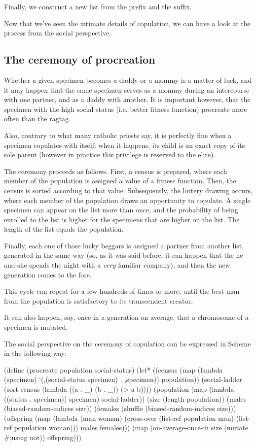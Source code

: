 Finally, we construct a new list from the prefix and the
suffix.

Now that we've seen the intimate details of copulation,
we can have a look at the process from the social perspective.

\subsection{The ceremony of procreation}

Whether a given specimen becomes a daddy or a mommy is
a matter of luck, and it may happen that the same specimen
serves as a mommy during an intercourse with one partner,
and as a daddy with another. It is important however, that the
specimen with the high social status (i.e. better fitness
function) procreate more often than the ragtag.

Also, contrary to what many catholic priests say, it is
perfectly fine when a specimen copulates with itself:
when it happens, its child is an exact copy of its sole
parent (however in practice this privilege is reserved
to the elite).

The ceremony proceeds as follows. First, a census is prepared,
where each member of the population is assigned a value
of a fitness function. Then, the census is sorted according
to that value. Subsequently, the lottery drawing occurs, where each
member of the population draws an opportunity to copulate.
A single specimen can appear on the list more than once, and
the probability of being enrolled to the list is higher for
the specimens that are higher on the list. The length of
the list equals the population. 

Finally, each one of those lucky beggars is assigned a partner
from another list generated in the same way (so, as it was said
before, it can happen that the he-and-she spends the night with
a \textit{very} familiar company), and then the new generation
comes to the fore.

This cycle can repeat for a few hundreds of times or more, until
the best man from the population is satisfactory to its
transcendent creator.

It can also happen, say, once in a generation on average,
that a chromosome of a specimen is mutated.

The social perspective on the ceremony of copulation can
be expressed in Scheme in the following way:

\begin{Snippet}
(define (procreate population social-status)
  (let* ((census (map (lambda (specimen)
			`(,(social-status specimen) . ,specimen))
		      population))
	 (social-ladder (sort census (lambda ((a . _) (b . _)) 
                                       (> a b))))
	 (population (map (lambda ((status . specimen)) specimen)
			  social-ladder))
	 (size (length population))
	 (males (biased-random-indices size))
	 (females (shuffle (biased-random-indices size)))
	 (offspring (map (lambda (man woman)
			   (cross-over (list-ref population man)
				       (list-ref population woman)))
			 males females)))
     (map (on-average-once-in size (mutate #;using not)) offspring)))
\end{Snippet}

